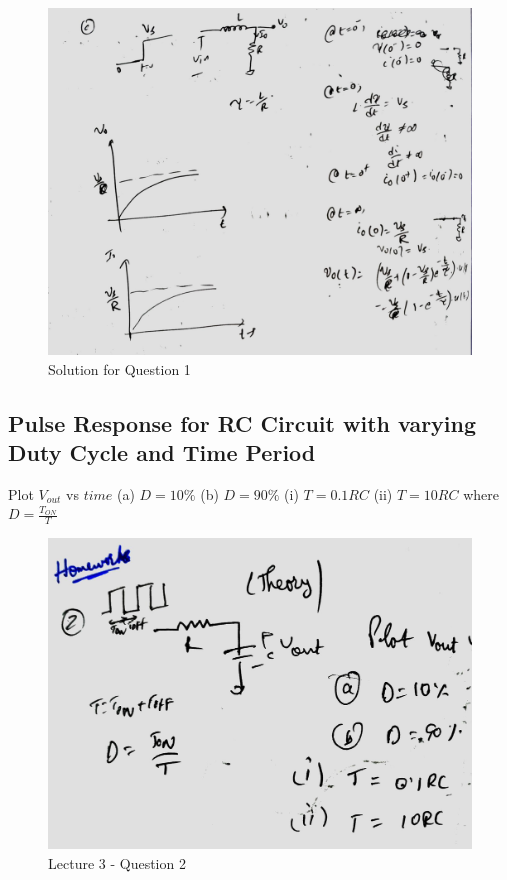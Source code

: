 \documentclass[a4paper]{article}
\begin{document}
\begin{figure}
    \centering
    \includegraphics[width=1\linewidth]{images/Lec_3_Q1_Soln_2.jpeg}
    \caption{Solution for Question 1}
\end{figure}


\subsection{Pulse Response for RC Circuit with varying Duty Cycle and Time Period}
Plot $V_{out}$ vs $time$ (a) $D = 10\%$ (b) $D = 90\%$ (i) $T = 0.1RC$ (ii) $T = 10RC$ where $D = \frac{T_{ON}}{T}$
\begin{figure}
    \centering
    \includegraphics[width=0.8\linewidth]{images/Lec_3_Q_2.jpeg}
    \caption{Lecture 3 - Question 2}
\end{figure}
\end{document}

